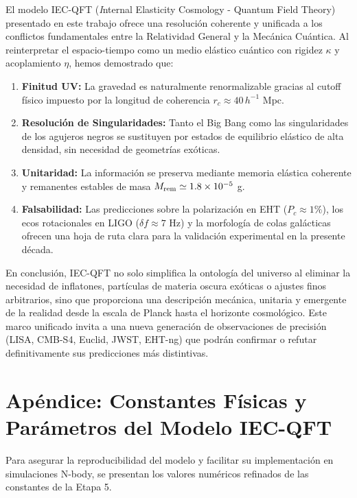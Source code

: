 \documentclass[11pt,a4paper]{article}
\begin{document}
El modelo IEC-QFT ({\textit Internal Elasticity Cosmology - Quantum Field Theory}) presentado en este trabajo ofrece una resolución coherente y unificada a los conflictos fundamentales entre la Relatividad General y la Mecánica Cuántica. Al reinterpretar el espacio-tiempo como un medio elástico cuántico con rigidez \( \kappa \) y acoplamiento \( \eta \), hemos demostrado que:

\begin{enumerate}
	\item \textbf{Finitud UV:} La gravedad es naturalmente renormalizable gracias al cutoff físico impuesto por la longitud de coherencia \( r_c \approx 40\, h^{-1} \) Mpc.
	\item \textbf{Resolución de Singularidades:} Tanto el Big Bang como las singularidades de los agujeros negros se sustituyen por estados de equilibrio elástico de alta densidad, sin necesidad de geometrías exóticas.
	\item \textbf{Unitaridad:} La información se preserva mediante memoria elástica coherente y remanentes estables de masa \( M_{\rm rem} \simeq 1.8 \times 10^{-5} \) g.
	\item \textbf{Falsabilidad:} Las predicciones sobre la polarización en EHT (\( P_c \approx 1\% \)), los ecos rotacionales en LIGO (\( \delta f \approx 7 \) Hz) y la morfología de colas galácticas ofrecen una hoja de ruta clara para la validación experimental en la presente década.
\end{enumerate}

En conclusión, IEC-QFT no solo simplifica la ontología del universo al eliminar la necesidad de inflatones, partículas de materia oscura exóticas o ajustes finos arbitrarios, sino que proporciona una descripción mecánica, unitaria y emergente de la realidad desde la escala de Planck hasta el horizonte cosmológico. Este marco unificado invita a una nueva generación de observaciones de precisión (LISA, CMB-S4, Euclid, JWST, EHT-ng) que podrán confirmar o refutar definitivamente sus predicciones más distintivas.

\appendix
\section{Apéndice: Constantes Físicas y Parámetros del Modelo IEC-QFT}

Para asegurar la reproducibilidad del modelo y facilitar su implementación en simulaciones N-body, se presentan los valores numéricos refinados de las constantes de la Etapa 5.
\end{document}
